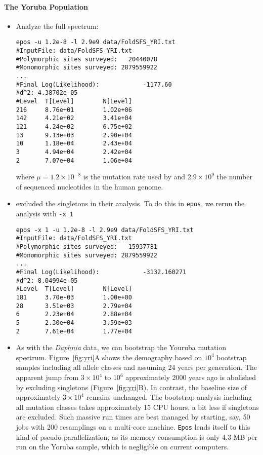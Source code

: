 \documentclass[a4paper, english]{article}
\newcommand{\ty}{\texttt}
\begin{document}
\paragraph{The Yoruba Population}
\begin{itemize}
\item Analyze the full spectrum:
\begin{verbatim}
epos -u 1.2e-8 -l 2.9e9 data/FoldSFS_YRI.txt 
#InputFile: data/FoldSFS_YRI.txt
#Polymorphic sites surveyed:   20440078
#Monomorphic sites surveyed: 2879559922
...
#Final Log(Likelihood):            -1177.60
#d^2: 4.38702e-05
#Level  T[Level]        N[Level]
216     8.76e+01        1.02e+06
142     4.21e+02        3.41e+04
121     4.24e+02        6.75e+02
13      9.13e+03        2.90e+04
10      1.18e+04        2.43e+04
3       4.94e+04        2.42e+04
2       7.07e+04        1.06e+04
\end{verbatim}
where $\mu=1.2\times 10^{-8}$ is the mutation rate used by
\cite{lap17:acc} and $2.9\times 10^9$ the number of sequenced
nucleotides in the human genome.
\item \cite{lap17:acc} excluded
the singletons in their analysis. To do this in \ty{epos}, we rerun the analysis with
\ty{-x 1}
\begin{verbatim}
epos -x 1 -u 1.2e-8 -l 2.9e9 data/FoldSFS_YRI.txt 
#InputFile: data/FoldSFS_YRI.txt
#Polymorphic sites surveyed:   15937781
#Monomorphic sites surveyed: 2879559922
...
#Final Log(Likelihood):            -3132.160271
#d^2: 8.04994e-05
#Level  T[Level]        N[Level]
181     3.70e-03        1.00e+00
28      3.51e+03        2.79e+04
6       2.23e+04        2.88e+04
5       2.30e+04        3.59e+03
2       7.61e+04        1.77e+04
\end{verbatim}
\item As with the \textit{Daphnia} data, we can bootstrap the Youruba
  mutation spectrum. Figure~\ref{fig:yri}A shows the demography based on $10^4$
  bootstrap samples including all allele classes and assuming 24 years
  per generation. The apparent jump from $3\times 10^4$ to $10^6$
  approximately 2000 years ago is abolished by
  excluding singletons (Figure~\ref{fig:yri}B). In contrast, the
  baseline size of approximately $3\times 10^4$ remains unchanged. The bootstrap analysis
  including all mutation classes takes approximately 15 CPU hours, a
  bit less if singletons are excluded. Such massive run times are
  best managed by starting, say, 50 jobs with 200 resamplings on a
  multi-core machine. \ty{Epos} lends itself to this kind of
  pseudo-parallelization, as its memory consumption is only 4.3 MB per
  run on the Yoruba sample, which is negligible on current computers.
\end{itemize}
\end{document}
